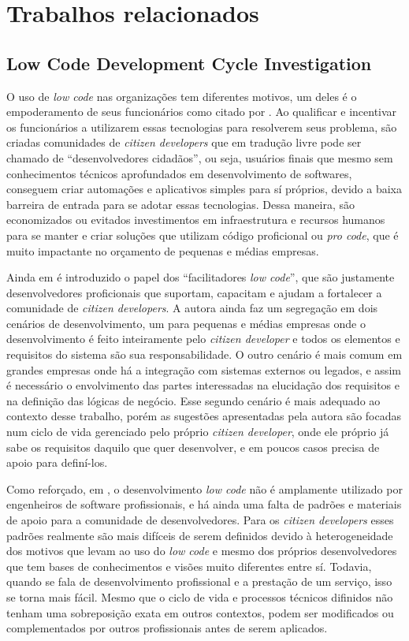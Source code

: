 	{\color{blue}
	\section{Trabalhos relacionados}
		
		\subsection{Low Code Development Cycle Investigation}
		O uso de \textit{low code} nas organizações tem diferentes motivos, um deles é o empoderamento de seus funcionários como citado por \cite{LowCodeLifeCicle}. 
		Ao qualificar e incentivar os funcionários a utilizarem essas tecnologias para resolverem seus problema, são criadas comunidades de \textit{citizen developers} que em tradução
		livre pode ser chamado de ``desenvolvedores cidadãos'', ou seja, usuários finais que mesmo sem conhecimentos técnicos aprofundados em desenvolvimento de softwares, conseguem criar
		automações e aplicativos simples para sí próprios, devido a baixa barreira de entrada para se adotar essas tecnologias. Dessa maneira, são economizados ou evitados investimentos em
		infraestrutura e recursos humanos para se manter e criar soluções que utilizam código proficional ou \textit{pro code}, que é muito impactante no orçamento de pequenas e médias empresas.

		Ainda em \cite{LowCodeLifeCicle} é introduzido o papel dos ``facilitadores \textit{low code}'', que são justamente desenvolvedores proficionais que suportam, capacitam e ajudam a
		fortalecer a comunidade de \textit{citizen developers}. A autora ainda faz um segregação em dois cenários de desenvolvimento, um para pequenas e médias empresas onde o desenvolvimento
		é feito inteiramente pelo \textit{citizen developer} e todos os elementos e requisitos do sistema são sua responsabilidade. O outro cenário é mais comum em grandes empresas onde há 
		a integração com sistemas externos ou legados, e assim é necessário o envolvimento das partes interessadas na elucidação dos requisitos e na definição das lógicas de negócio. Esse
		segundo cenário é mais adequado ao contexto desse trabalho, porém as sugestões apresentadas pela autora são focadas num ciclo de vida gerenciado pelo próprio \textit{citizen developer},
		onde ele próprio já sabe os requisitos daquilo que quer desenvolver, e em poucos casos precisa de apoio para definí-los.

		Como reforçado, em \cite{LowCodeLifeCicle}, o desenvolvimento \textit{low code} não é amplamente utilizado por engenheiros de software profissionais, e há ainda uma falta de padrões e
		materiais de apoio para a comunidade de desenvolvedores. Para os \textit{citizen developers} esses padrões realmente são mais difíceis de serem definidos devido à heterogeneidade dos
		motivos que levam ao uso do \textit{low code} e mesmo dos próprios desenvolvedores que tem bases de conhecimentos e visões muito diferentes entre sí. Todavia, quando se fala de desenvolvimento
		profissional e a prestação de um serviço, isso se torna mais fácil. Mesmo que o ciclo de vida e processos técnicos difinidos não tenham uma sobreposição exata em outros contextos, podem 
		ser modificados ou complementados por outros profissionais antes de serem aplicados.
		
}
